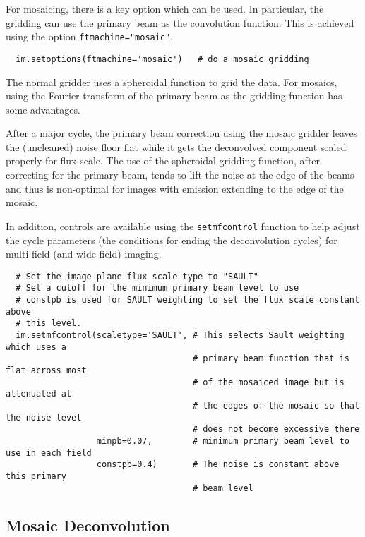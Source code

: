 \vspace{3mm}

For mosaicing, there is a key option which can be used. In particular,
the gridding can use the primary beam as the convolution function. This
is achieved using the option {\tt ftmachine="mosaic"}.

\small
\begin{verbatim}
  im.setoptions(ftmachine='mosaic')   # do a mosaic gridding
\end{verbatim}
\normalsize

The normal gridder uses a spheroidal function to grid the data. For
mosaics, using the Fourier transform of the primary beam as the
gridding function has some advantages.

After a major cycle, the primary beam correction using the mosaic
gridder leaves the (uncleaned) noise floor flat while it gets the
deconvolved component scaled properly for flux scale. The use of the
spheroidal gridding function, after correcting for the primary beam,
tends to lift the noise at the edge of the beams and thus is
non-optimal for images with emission extending to the edge of the
mosaic.

In addition, controls are available using the {\tt setmfcontrol}
function to help adjust the cycle parameters (the conditions for
ending the deconvolution cycles) for multi-field (and wide-field)
imaging.

\small
\begin{verbatim}
  # Set the image plane flux scale type to "SAULT"
  # Set a cutoff for the minimum primary beam level to use
  # constpb is used for SAULT weighting to set the flux scale constant above
  # this level.
  im.setmfcontrol(scaletype='SAULT', # This selects Sault weighting which uses a
                                     # primary beam function that is flat across most
                                     # of the mosaiced image but is attenuated at
                                     # the edges of the mosaic so that the noise level
                                     # does not become excessive there
                  minpb=0.07,        # minimum primary beam level to use in each field
                  constpb=0.4)       # The noise is constant above this primary
                                     # beam level
\end{verbatim}
\normalsize

\subsection{Mosaic Deconvolution}
\label{section:imtool.mosaic.deconv}

